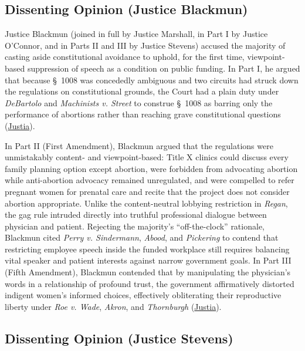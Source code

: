 \documentclass[12pt]{article}
\begin{document}
\subsection{Dissenting Opinion (Justice Blackmun)}

Justice Blackmun (joined in full by Justice Marshall, in Part I by Justice O'Connor, and in Parts II and III by Justice Stevens) accused the majority of casting aside constitutional avoidance to uphold, for the first time, viewpoint-based suppression of speech as a condition on public funding. In Part I, he argued that because \S~1008 was concededly ambiguous and two circuits had struck down the regulations on constitutional grounds, the Court had a plain duty under \textit{DeBartolo} and \textit{Machinists v. Street} to construe \S~1008 as barring only the performance of abortions rather than reaching grave constitutional questions (\href{https://supreme.justia.com/cases/federal/us/500/173/}{Justia}).

In Part II (First Amendment), Blackmun argued that the regulations were unmistakably content- and viewpoint-based: Title X clinics could discuss every family planning option except abortion, were forbidden from advocating abortion while anti-abortion advocacy remained unregulated, and were compelled to refer pregnant women for prenatal care and recite that the project does not consider abortion appropriate. Unlike the content-neutral lobbying restriction in \textit{Regan}, the gag rule intruded directly into truthful professional dialogue between physician and patient. Rejecting the majority's ``off-the-clock'' rationale, Blackmun cited \textit{Perry v. Sindermann}, \textit{Abood}, and \textit{Pickering} to contend that restricting employee speech inside the funded workplace still requires balancing vital speaker and patient interests against narrow government goals. In Part III (Fifth Amendment), Blackmun contended that by manipulating the physician's words in a relationship of profound trust, the government affirmatively distorted indigent women's informed choices, effectively obliterating their reproductive liberty under \textit{Roe v. Wade}, \textit{Akron}, and \textit{Thornburgh} (\href{https://supreme.justia.com/cases/federal/us/500/173/}{Justia}).

\subsection{Dissenting Opinion (Justice Stevens)}
\end{document}
